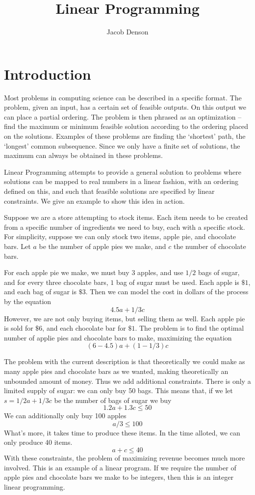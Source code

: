 \documentclass{report}
\title{Linear Programming}
\author{Jacob Denson}
\begin{document}
    \maketitle

    \chapter{Introduction}

    Most problems in computing science can be described in a specific format. The problem, given an input, has a certain set of feasible outputs. On this output we can place a partial ordering. The problem is then phrased as an optimization -- find the maximum or minimum feasible solution according to the ordering placed on the solutions. Examples of these problems are finding the `shortest' path, the `longest' common subsequence. Since we only have a finite set of solutions, the maximum can always be obtained in these problems.

    Linear Programming attempts to provide a general solution to problems where solutions can be mapped to real numbers in a linear fashion, with an ordering defined on this, and such that feasible solutions are specified by linear constraints. We give an example to show this idea in action.

    Suppose we are a store attempting to stock items. Each item needs to be created from a specific number of ingredients we need to buy, each with a specific stock. For simplicity, suppose we can only stock two items, apple pie, and chocolate bars. Let $a$ be the number of apple pies we make, and $c$ the number of chocolate bars.

    For each apple pie we make, we must buy $3$ apples, and use $1/2$ bags of sugar, and for every three chocolate bars, $1$ bag of sugar must be used. Each apple is $\$1$, and each bag of sugar is $\$3$. Then we can model the cost in dollars of the process by the equation
    \[ 4.5a + 1/3c \]
    However, we are not only buying items, but selling them as well. Each apple pie is sold for $\$6$, and each chocolate bar for $\$1$. The problem is to find the optimal number of applie pies and chocolate bars to make, maximizing the equation
    \[ (6 - 4.5)a + (1 - 1/3)c \]

    The problem with the current description is that theoretically we could make as many apple pies and chocolate bars as we wanted, making theoretically an unbounded amount of money. Thus we add additional constraints. There is only a limited supply of sugar: we can only buy 50 bags. This means that, if we let $s = 1/2a + 1/3c$ be the number of bags of sugar we buy
    \[ 1.2a + 1.3c \leq 50 \]
    We can additionally only buy 100 apples
    \[ a/3 \leq 100 \]
    What's more, it takes time to produce these items. In the time alloted, we can only produce 40 items.
    \[ a + c \leq 40 \]
    With these constraints, the problem of maximizing revenue becomes much more involved. This is an example of a linear program. If we require the number of apple pies and chocolate bars we make to be integers, then this is an integer linear programming.
\end{document}
